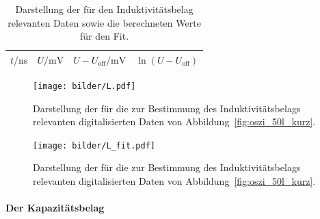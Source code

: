 \begin{table}[htpb]
  \centering
  \begin{tabular}{cccc}
    \midrule
    \midrule
    $t / \si{\nano\second}$ & $U / \si{\milli\volt}$ &
    $U - U_\text{off} / \si{\milli\volt}$ & $\ln(U - U_\text{off})$ \\
    \midrule
    
    \midrule
    \midrule
  \end{tabular}
  \caption{Darstellung der für den Induktivitätsbelag relevanten Daten sowie
  die berechneten Werte für den Fit.}
  \label{tab:L_Daten}
\end{table}
\begin{figure}[htpb]
  \centering
  \texttt{[image: bilder/L.pdf]}
  \caption{Darstellung der für die zur Bestimmung des Induktivitätsbelags
    relevanten digitalisierten Daten von Abbildung~\ref{fig:oszi_50l_kurz}.}
  \label{fig:induktivitaetsbelag}
  \texttt{[image: bilder/L\_fit.pdf]}
  \caption{Darstellung der für die zur Bestimmung des Induktivitätsbelags
    relevanten digitalisierten Daten von Abbildung~\ref{fig:oszi_50l_kurz}.}
  \label{fig:induktivitaetsbelag_fit}
\end{figure}

\clearpage
\paragraph{Der Kapazitätsbelag}
\label{par:der_kapazit_tsbelag}

